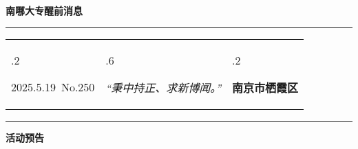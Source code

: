 \documentclass[letterpaper, 12pt]{article}
\begin{document}
\begin{center}
    \Huge\textbf{南哪大专醒前消息}
\end{center}
\vspace{4mm}
\hrule
\renewcommand\tabularxcolumn[1]{m{#1}}
\begin{tabularx}{\textwidth}{>{\hsize.2\hsize}X>{\hsize.6\hsize}X>{\hsize.2\hsize}X}
    \begin{flushleft}
        2025.5.19\, No.250
    \end{flushleft}
    &
    \begin{center}
        \textit{“秉中持正、求新博闻。”}
    \end{center}
    &
    \begin{flushright}
        \textbf{南京市栖霞区}
    \end{flushright}
\end{tabularx}
\vspace{-3.5mm}
\hrule
\vspace{4mm}
\centerline{\huge\textbf{活动预告}}
\end{document}
